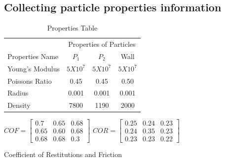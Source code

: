 \documentclass{tufte-book} %
\begin{document}
\subsection{Collecting particle properties information}
\begin{table} %
\centering %
\begin{tabular}{l c c c} %
\toprule %
& \multicolumn{3}{c}{Properties of Particles} \\ %
\cmidrule(l){2-4} %
Properties Name & $P_1$ & $P_2$ & Wall \\ %
\midrule %
Young's Modulus & $5X10^7$ & $5X10^7$ & $5X10^7$ \\ %
  Poissons Ratio & 0.45 & 0.45 & 0.50 \\ %
  Radius & 0.001 & 0.001 & 0.001 \\
  Density & 7800 & 1190 & 2000 \\
\midrule %

\bottomrule %
\end{tabular}
\caption{Properties Table} %
\label{tab:template} %
\end{table}

 \begin{marginfigure}
    \centering
    $COF =
    \begin{bmatrix}
      0.7&0.65&0.68\\ 0.65&0.60&0.68 \\
      0.68&0.68&0.3
   
    \end{bmatrix}$
\vspace{2ex}
    $COR =
     \begin{bmatrix}
      0.25&0.24&0.23\\ 0.24&0.35&0.23 \\
      0.23&0.23&0.22
   
    \end{bmatrix}$
    
    \caption{Coefficient of Restitutions and Friction}
    \label{fig:matrix}
  \end{marginfigure}
\end{document}
